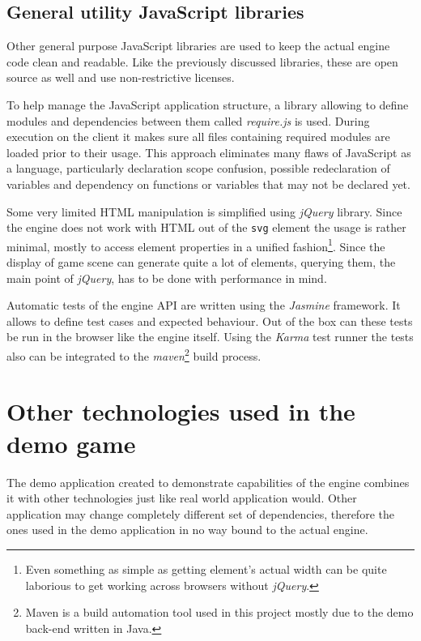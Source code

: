 \documentclass[11pt,oneside, final]{fithesis2}
\begin{document}
\subsection{General utility JavaScript libraries}
\label{jslibs}
Other general purpose JavaScript libraries are used to keep the actual engine code clean and readable. Like the previously discussed libraries, these are open source as well and use non-restrictive licenses.

To help manage the JavaScript application structure, a library allowing to define modules and dependencies between them called \emph{require.js} is used. During execution on the client it makes sure all files containing required modules are loaded prior to their usage. \cite{requirejs} This approach eliminates many flaws of JavaScript as a language, particularly declaration scope confusion, possible redeclaration of variables and dependency on functions or variables that may not be declared yet.

Some very limited HTML manipulation is simplified using \emph{jQuery} library. Since the engine does not work with HTML out of the \texttt{svg} element the usage is rather minimal, mostly to access element properties in a unified fashion\footnote{Even something as simple as getting element's actual width can be quite laborious to get working across browsers without \emph{jQuery}.}. Since the display of game scene can generate quite a lot of elements, querying them, the main point of \emph{jQuery}\cite{jquery}, has to be done with performance in mind.

Automatic tests of the engine API are written using the \emph{Jasmine} framework. It allows to define test cases and expected behaviour\cite{jasmine}. Out of the box can these tests be run in the browser like the engine itself. Using the \emph{Karma} test runner the tests also can be integrated to the \emph{maven}\footnote{Maven is a build automation tool\cite{maven} used in this project mostly due to the demo back-end written in Java.} build process\cite{karma}.

\section{Other technologies used in the demo game}
The demo application created to demonstrate capabilities of the engine combines it with other technologies just like real world application would. Other application may change completely different set of dependencies, therefore the ones used in the demo application in no way bound to the actual engine.
\end{document}
